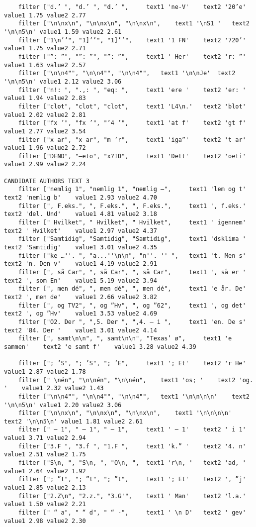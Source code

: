 {\begin{verbatim}
	filter ["d.’ ", "d.’ ", "d.’ ", 	text1 'ne-V'	text2 '20’e'	value1 1.75	value2 2.77
	filter ["\n\nx\n", "\n\nx\n", "\n\nx\n", 	text1 '\nS1 '	text2 '\n\n5\n'	value1 1.59	value2 2.61
	filter ["1\n’’", "1]’’", "1]’’", 	text1 '1 FN'	text2 '720’'	value1 1.75	value2 2.71
	filter ["”: ”", "”: ”", "”: ”", 	text1 ' Her'	text2 'r: ”'	value1 1.63	value2 2.57
	filter ["\n\n4"", "\n\n4"", "\n\n4"", 	text1 '\n\nJe'	text2 '\n\n5\n'	value1 2.12	value2 3.06
	filter ["n!: ", ".,: ", "eq: ", 	text1 'ere '	text2 'er: '	value1 1.94	value2 2.83
	filter ["clot", "clot", "clot", 	text1 'L4\n.'	text2 'blot'	value1 2.02	value2 2.81
	filter ["fx ’", "fx ’", "’4 ’", 	text1 'at f'	text2 'gt f'	value1 2.77	value2 3.54
	filter ["x ar", "x ar", "m ’r", 	text1 'iga”'	text2 't ar'	value1 1.96	value2 2.72
	filter ["DEND", "–eto", "x?ID", 	text1 'Dett'	text2 'oeti'	value1 2.99	value2 2.24

CANDIDATE AUTHORS TEXT 3
	filter ["nemlig 1", "nemlig 1", "nemlig –", 	text1 'lem og t'	text2 'nemlig b'	value1 2.93	value2 4.70
	filter [", F.eks.", ", F.eks.", ", F.eks.", 	text1 ', f.eks.'	text2 'del. Und'	value1 4.81	value2 3.18
	filter [" Hvilket", " Hvilket", " Hvilket", 	text1 ' igennem'	text2 ' Hvilket'	value1 2.97	value2 4.37
	filter ["Samtidig", "Samtidig", "Samtidig", 	text1 'dsklima '	text2 'Samtidig'	value1 3.01	value2 4.35
	filter ["ke …''. ", "a...''\n\n", "n''. '' ", 	text1 't. Men s'	text2 'n. Den v'	value1 4.19	value2 2.91
	filter [", så Car", ", så Car", ", så Car", 	text1 ', så er '	text2 ', som En'	value1 5.19	value2 3.94
	filter [", men dé", ", men dé", ", men dé", 	text1 'e år. De'	text2 ', men de'	value1 2.66	value2 3.82
	filter [", og TV2", ", og ”Hv", ", og ”62", 	text1 ', og det'	text2 ', og ”Hv'	value1 3.53	value2 4.69
	filter ["O2. Der ", ",5. Der ", ",4. – i ", 	text1 'en. De s'	text2 '84. Der '	value1 3.01	value2 4.14
	filter [", samt\n\n", ", samt\n\n", "Texas’ ø", 	text1 'e sammen'	text2 'e samt f'	value1 3.28	value2 4.39

	filter ["; ’S", "; ’S", "; ’E", 	text1 '; Et'	text2 'r He'	value1 2.87	value2 1.78
	filter [" \nén", "\n\nén", "\n\nén", 	text1 'os; '	text2 'og. '	value1 2.32	value2 1.43
	filter ["\n\n4"", "\n\n4"", "\n\n4"", 	text1 '\n\n\n\n'	text2 '\n\n5\n'	value1 2.20	value2 3.06
	filter ["\n\nx\n", "\n\nx\n", "\n\nx\n", 	text1 '\n\n\n\n'	text2 '\n\n5\n'	value1 1.81	value2 2.61
	filter [" – 1", " – 1", " – 1", 	text1 ' – 1'	text2 ' i 1'	value1 3.71	value2 2.94
	filter ["3.F ", "3.f ", "1.F ", 	text1 'k.” '	text2 '4. n'	value1 2.51	value2 1.75
	filter ["S\n, ", "S\n, ", "O\n, ", 	text1 'r\n, '	text2 'ad, '	value1 2.64	value2 1.92
	filter ["; ”t", "; ”t", "; ”t", 	text1 '; Et'	text2 ', ”j'	value1 2.85	value2 2.13
	filter ["2.Z\n", "2.z.", "3.G'", 	text1 ' Man'	text2 'l.a.'	value1 1.50	value2 2.21
	filter [" “ a", " “ d", " “ -", 	text1 ' \n D'	text2 ' gev'	value1 2.98	value2 2.30


\end{verbatim}}
